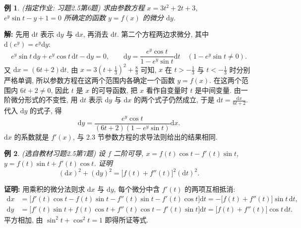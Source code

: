 \documentclass[UTF8,openany]{ctexbook}
\theoremstyle{chinesetextbook}
\newtheorem{example}{例}[section]
\newenvironment{cnproof}{\par\indent\textbf{证明:} \ignorespaces}{\par}
\newenvironment{cnsolution}{\par\indent\textbf{解:} \ignorespaces}{\par}
\newcommand{\dd}{\mathrm d}
\begin{document}
\begin{example}\label{ex:c2-h5-6}
\textnormal{(指定作业: 习题2.5第6题)} 求由参数方程 $x=3t^2+2t+3$, $e^y\sin t-y+1=0$ 所确定的函数 $y=f(x)$ 的微分 $\dd y$.
\end{example}
\begin{cnsolution}
先用 $\dd t$ 表示 $\dd y$ 与 $\dd x$, 再消去 $\dd t$. 第二个方程两边求微分, 其中 $\dd(e^y)=e^y\dd y$:
\[
e^y\sin t\,\dd y+e^y\cos t\,\dd t-\dd y=0,\qquad\dd y=\frac{e^y\cos t}{1-e^y\sin t}\dd t\quad(1-e^y\sin t\ne0).
\]
又 $\dd x=(6t+2)\dd t$. 由 $\displaystyle x=3\left(t+\frac13\right)^2+\frac83$ 可知, $x$ 在 $\displaystyle t>-\frac13$ 与 $\displaystyle t<-\frac13$ 时分别严格单调, 所以参数方程在这两个范围内各确定一个函数 $y=f(x)$. 在这两个范围内 $6t+2\ne0$, 因此 $t$ 是 $x$ 的可导函数, 把 $x$ 看作自变量时 $t$ 是中间变量. 由一阶微分形式的不变性, 用 $\dd t$ 表示 $\dd y$ 与 $\dd x$ 的两个式子仍然成立, 于是 $\displaystyle\dd t=\frac{\dd x}{6t+2}$. 代入 $\dd y$ 的式子, 得
\[
\dd y=\frac{e^y\cos t}{(6t+2)(1-e^y\sin t)}\dd x.
\]
$\dd x$ 的系数就是 $f'(x)$, 与 2.3 节参数方程的求导法则给出的结果相同.
\end{cnsolution}
\begin{example}\label{ex:c2-h5-7}
\textnormal{(选自教材习题2.5第7题)} 设 $f$ 二阶可导, $x=f(t)\cos t-f'(t)\sin t$, $y=f(t)\sin t+f'(t)\cos t$. 证明
\[
(\dd x)^2+(\dd y)^2=\bigl[f(t)+f''(t)\bigr]^2(\dd t)^2.
\]
\end{example}
\begin{cnproof}
用乘积的微分法则求 $\dd x$ 与 $\dd y$, 每个微分中含 $f'(t)$ 的两项互相抵消:
\[
\begin{aligned}
\dd x&=\bigl[f'(t)\cos t-f(t)\sin t-f''(t)\sin t-f'(t)\cos t\bigr]\dd t=-\bigl[f(t)+f''(t)\bigr]\sin t\,\dd t,\\
\dd y&=\bigl[f'(t)\sin t+f(t)\cos t+f''(t)\cos t-f'(t)\sin t\bigr]\dd t=\bigl[f(t)+f''(t)\bigr]\cos t\,\dd t.
\end{aligned}
\]
平方相加, 由 $\sin^2t+\cos^2t=1$ 即得所证等式.
\end{cnproof}
\end{document}

